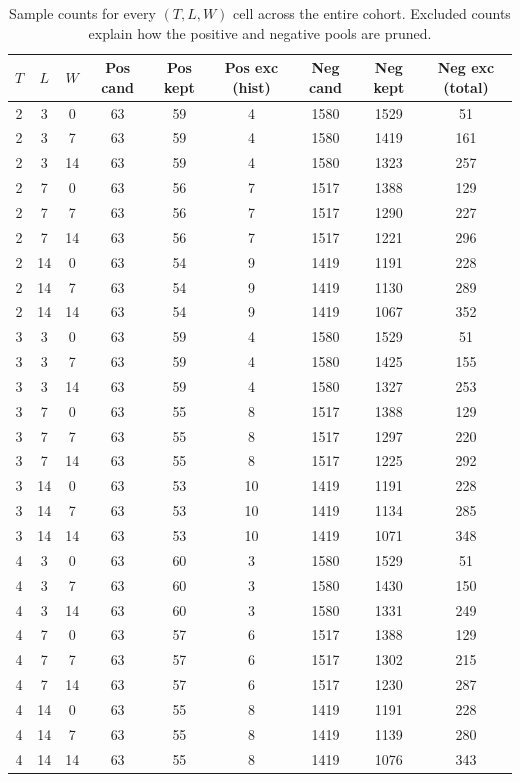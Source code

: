 \begin{table}[t]
\centering
\small
\caption{Sample counts for every $(T,L,W)$ cell across the entire cohort.  Excluded counts explain how the positive and negative pools are pruned.}\label{tab:v2_sample_counts}
\begin{tabular}{ccccccccc}
\toprule
$T$ & $L$ & $W$ & Pos cand & Pos kept & Pos exc (hist) & Neg cand & Neg kept & Neg exc (total) \\
\midrule
2 & 3 & 0 & 63 & 59 & 4 & 1580 & 1529 & 51 \\
2 & 3 & 7 & 63 & 59 & 4 & 1580 & 1419 & 161 \\
2 & 3 & 14 & 63 & 59 & 4 & 1580 & 1323 & 257 \\
2 & 7 & 0 & 63 & 56 & 7 & 1517 & 1388 & 129 \\
2 & 7 & 7 & 63 & 56 & 7 & 1517 & 1290 & 227 \\
2 & 7 & 14 & 63 & 56 & 7 & 1517 & 1221 & 296 \\
2 & 14 & 0 & 63 & 54 & 9 & 1419 & 1191 & 228 \\
2 & 14 & 7 & 63 & 54 & 9 & 1419 & 1130 & 289 \\
2 & 14 & 14 & 63 & 54 & 9 & 1419 & 1067 & 352 \\
3 & 3 & 0 & 63 & 59 & 4 & 1580 & 1529 & 51 \\
3 & 3 & 7 & 63 & 59 & 4 & 1580 & 1425 & 155 \\
3 & 3 & 14 & 63 & 59 & 4 & 1580 & 1327 & 253 \\
3 & 7 & 0 & 63 & 55 & 8 & 1517 & 1388 & 129 \\
3 & 7 & 7 & 63 & 55 & 8 & 1517 & 1297 & 220 \\
3 & 7 & 14 & 63 & 55 & 8 & 1517 & 1225 & 292 \\
3 & 14 & 0 & 63 & 53 & 10 & 1419 & 1191 & 228 \\
3 & 14 & 7 & 63 & 53 & 10 & 1419 & 1134 & 285 \\
3 & 14 & 14 & 63 & 53 & 10 & 1419 & 1071 & 348 \\
4 & 3 & 0 & 63 & 60 & 3 & 1580 & 1529 & 51 \\
4 & 3 & 7 & 63 & 60 & 3 & 1580 & 1430 & 150 \\
4 & 3 & 14 & 63 & 60 & 3 & 1580 & 1331 & 249 \\
4 & 7 & 0 & 63 & 57 & 6 & 1517 & 1388 & 129 \\
4 & 7 & 7 & 63 & 57 & 6 & 1517 & 1302 & 215 \\
4 & 7 & 14 & 63 & 57 & 6 & 1517 & 1230 & 287 \\
4 & 14 & 0 & 63 & 55 & 8 & 1419 & 1191 & 228 \\
4 & 14 & 7 & 63 & 55 & 8 & 1419 & 1139 & 280 \\
4 & 14 & 14 & 63 & 55 & 8 & 1419 & 1076 & 343 \\
\bottomrule
\end{tabular}
\end{table}
